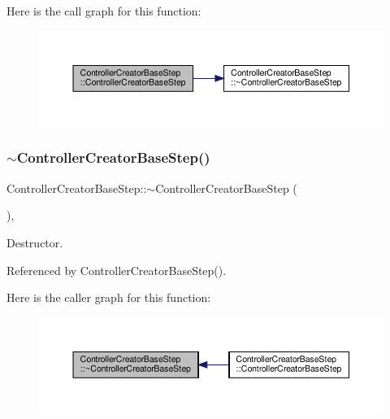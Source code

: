 Here is the call graph for this function\+:
\nopagebreak
\begin{figure}[H]
\begin{center}
\leavevmode
\includegraphics[width=350pt]{d5/d28/classControllerCreatorBaseStep_a3a40d6aa636355cf2059e04ea6f9e2af_cgraph}
\end{center}
\end{figure}
\mbox{\label{classControllerCreatorBaseStep_aec6e95d7d03daad670dcea1eeb6121da}} 
\subsubsection{\texorpdfstring{$\sim$\+Controller\+Creator\+Base\+Step()}{~ControllerCreatorBaseStep()}}
{\footnotesize\ttfamily Controller\+Creator\+Base\+Step\+::$\sim$\+Controller\+Creator\+Base\+Step (\begin{DoxyParamCaption}{ }\end{DoxyParamCaption})\hspace{0.3cm}{\ttfamily [override]}, {\ttfamily [default]}}



Destructor. 



Referenced by Controller\+Creator\+Base\+Step().

Here is the caller graph for this function\+:
\nopagebreak
\begin{figure}[H]
\begin{center}
\leavevmode
\includegraphics[width=350pt]{d5/d28/classControllerCreatorBaseStep_aec6e95d7d03daad670dcea1eeb6121da_icgraph}
\end{center}
\end{figure}


